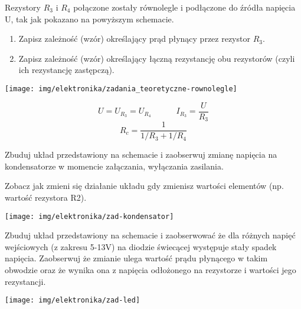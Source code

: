 \dbEntryCheckResults
\begin{minipage}[b]{0.71\textwidth}
  Rezystory $R_3$ i $R_4$ połączone zostały równolegle i podłączone do źródła napięcia U, tak jak pokazano na powyższym schemacie.
  \begin{enumerate}[label=\alph*)]
    \item Zapisz zależność (wzór) określający prąd płynący przez rezystor $R_3$.
    \item Zapisz zależność (wzór) określający łączną rezystancję obu rezystorów (czyli ich rezystancję zastępczą).
  \end{enumerate}
\end{minipage}
\hfill
\begin{minipage}[b]{0.28\textwidth}
	\texttt{[image: img/elektronika/zadania\_teoretyczne-rownolegle]}
\end{minipage}
\fi
{}\dbEntryCheckResults
$$U = U_{R_3} = U_{R_4}  \quad\qquad  I_{R_3} = \frac{U}{R_3}$$
$$R_c = \frac{1}{1/R_3 + 1/R_4}$$
\fi

%
%

\dbEntryCheckResults
\noindent\begin{minipage}[b]{0.55\textwidth}
Zbuduj układ przedstawiony na schemacie i zaobserwuj zmianę napięcia na kondensatorze w momencie załączania, wyłączania zasilania.

\vspace{13pt}

Zobacz jak zmieni się działanie układu gdy zmienisz wartości elementów (np. wartość rezystora R2).

\ifdefined\ladowanieKondensatoraWartosci\vspace{13pt}\ladowanieKondensatoraWartosci\fi
\end{minipage}
\hfill
\begin{minipage}[b]{0.4\textwidth}
\texttt{[image: img/elektronika/zad-kondensator]}
\end{minipage}
\fi


\dbEntryCheckResults
\noindent\begin{minipage}[b]{0.7\textwidth}
Zbuduj układ przedstawiony na schemacie i zaobserwować że dla różnych napięć wejściowych (z zakresu 5-13V) na diodzie świecącej występuje stały spadek napięcia.
Zaobserwuj że zmianie ulega wartość prądu płynącego w takim obwodzie oraz że wynika ona z napięcia odłożonego na rezystorze i wartości jego rezystancji.
\end{minipage}
\hfill
\begin{minipage}[b]{0.25\textwidth}
\texttt{[image: img/elektronika/zad-led]}\vspace{0.5cm}
\end{minipage}

